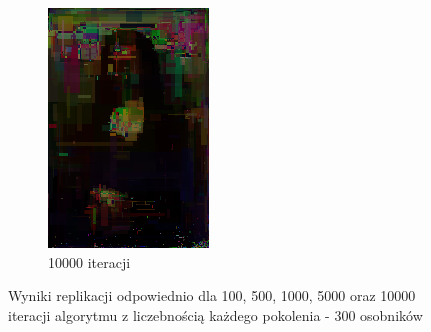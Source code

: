 \begin{figure}[!htb]
\begin{subfigure}[b]{0.3\textwidth}
         \includegraphics[width=\textwidth]{images/mona/10000_300_2/img_0_it_10000_best.png}
         \caption{10000 iteracji}
    \end{subfigure}
    \caption{Wyniki replikacji odpowiednio dla 100, 500, 1000, 5000 oraz 10000 iteracji algorytmu z liczebnością każdego pokolenia - 300 osobników}
    \label{fig:iterations_1}
\end{figure}

